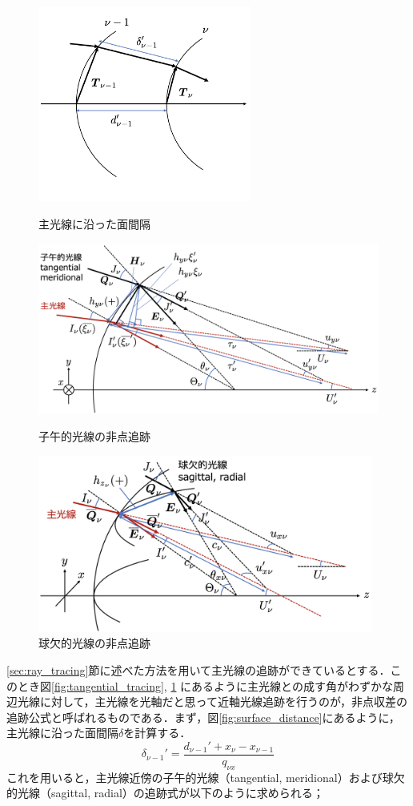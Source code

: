 \documentclass{jsarticle}
\begin{document}
\begin{figure}
    \centering
    \includegraphics[width=7cm]{surface_distance.png}
    \caption{主光線に沿った面間隔}
    \label{fig:surface_distance}

    \centering
    \includegraphics[width=12cm]{tangential_tracing.png}
    \caption{子午的光線の非点追跡}
    \label{fig:tangential_tracing}

    \centering
    \includegraphics[width=11cm]{sagittal_tracing.png}
    \caption{球欠的光線の非点追跡}
    \label{fig:sagittal_tracing}
\end{figure}

\ref{sec:ray_tracing}節に述べた方法を用いて主光線の追跡ができているとする．このとき図\ref{fig:tangential_tracing}, \ref{fig:sagittal_tracing}
にあるように主光線との成す角がわずかな周辺光線に対して，主光線を光軸だと思って近軸光線追跡を行うのが，非点収差の追跡公式と呼ばれるものである．まず，図\ref{fig:surface_distance}にあるように，主光線に沿った面間隔$\delta$を計算する．
%
\begin{equation}
    \delta_{\nu-1}'=\frac{d_{\nu-1}'+x_\nu-x_{\nu-1}}{q_{\nu x}}
\end{equation}
%
これを用いると，主光線近傍の子午的光線（tangential, meridional）および球欠的光線（sagittal, radial）の追跡式が以下のように求められる；
\end{document}
